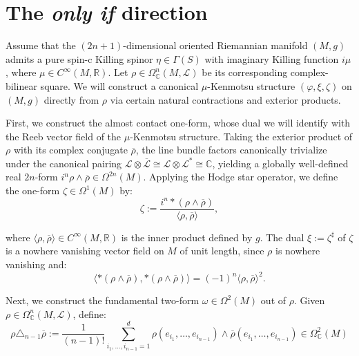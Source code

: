 \documentclass[10pt,a4paper,twoside,reqno]{amsart}
\theoremstyle{plain}
\theoremstyle{definition}
\theoremstyle{remark}
\def\R{\mathbb{R}}
\def\R{\mathbb{R}}
\def\cL{\mathcal{L}}
\newcommand{\escal}[1]{\langle#1\rangle}
\begin{document}
\section{The \emph{only if} direction}
\label{sec:onlyif}


Assume that the $(2n+1)$-dimensional oriented Riemannian manifold $(M,g)$ admits a pure spin-c Killing spinor $\eta \in \Gamma(S)$ with imaginary Killing function $i\mu$, where $\mu \in C^{\infty}(M,\mathbb{R})$. Let $\rho \in \Omega^n_{\mathbb{C}}(M, \mathcal{L})$ be its corresponding complex-bilinear square. We will construct a canonical $\mu$-Kenmotsu structure $(\varphi,\xi,\zeta)$ on $(M,g)$ directly from $\rho$ via certain natural contractions and exterior products.\medskip

First, we construct the almost contact one-form, whose dual we will identify with the Reeb vector field of the $\mu$-Kenmotsu structure. Taking the exterior product of $\rho$ with its complex conjugate $\overline{\rho}$, the line bundle factors canonically trivialize under the canonical pairing $\mathcal{L} \otimes \overline{{\mathcal{L}}}\cong\mathcal{L}\otimes\mathcal{L}^\ast\cong\mathbb{C}$, yielding a globally well-defined real $2n$-form $i^n\rho \wedge \overline{\rho} \in \Omega^{2n}(M)$. Applying the Hodge star operator, we define the one-form $\zeta \in \Omega^1(M)$ by:
\begin{equation*}
\zeta := \frac{i^n*(\rho\wedge\overline{\rho})}{\escal{\rho,\overline{\rho}}},
\end{equation*}

\noindent
where $\langle \rho, \overline{\rho} \rangle \in C^{\infty}(M,\R)$ is the inner product defined by $g$. The dual $\xi := \zeta^\sharp$ of $\zeta$ is a nowhere vanishing vector field on $M$ of unit length, since $\rho$ is nowhere vanishing and:
\begin{equation*}
\escal{*(\rho\wedge\overline{\rho}),*(\rho\wedge\overline{\rho})}=(-1)^n\escal{\rho,\overline{\rho}}^2.
\end{equation*}

\noindent
Next, we construct the fundamental two-form $\omega \in \Omega^2(M)$ out of $\rho$. Given $\rho\in \Omega^n_{\mathbb{C}}(M,\cL)$, define:
\begin{equation*}
\rho \triangle_{n-1} \overline{\rho} := \frac{1}{(n-1)!} \sum_{i_1, \dots, i_{n-1} = 1} ^d \rho(e_{i_1},\hdots , e_{i_{n-1}}) \wedge \overline{\rho}(e_{i_1},\hdots , e_{i_{n-1}})\in \Omega^2_{\mathbb{C}}(M)
\end{equation*}
\end{document}
